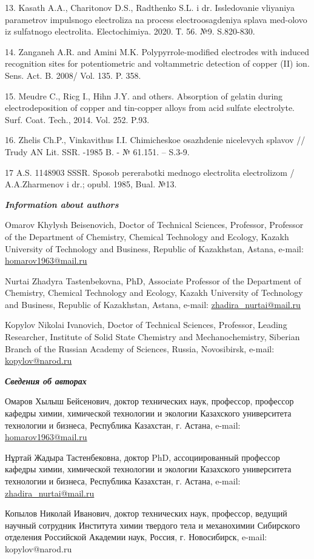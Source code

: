 13. Kasath A.A., Charitonov D.S., Radthenko S.L. i dr. Issledovanie
vliyaniya parametrov impulsnogo electroliza na process electroosagdeniya
splava med-olovo iz sulfatnogo electrolita. Electochimiya. 2020. Т. 56.
№9. S.820-830.

14. Zanganeh A.R. and Amini M.K. Polypyrrole-modified electrodes with
induced recognition sites for potentiometric and voltammetric detection
of copper (II) ion. Sens. Act. B. 2008/ Vol. 135. P. 358.

15. Meudre C., Ricg I., Hihn J.Y. and others. Absorption of gelatin
during electrodeposition of copper and tin-copper alloys from acid
sulfate electrolyte. Surf. Coat. Tech., 2014. Vol. 252. P.93.

16. Zhelis Ch.P., Vinkavithus I.I. Chimicheskoe osazhdenie nicelevych
splavov // Trudy AN Lit. SSR. -1985 B. - № 61.151. -- S.3-9.

17 A.S. 1148903 SSSR. Sposob pererabotki mednogo electrolita
electrolizom / A.A.Zharmenov i dr.; opubl. 1985, Bual. №13.

\emph{{\bfseries Information about authors}}

Omarov Khylysh Beisenovich, Doctor of Technical Sciences, Professor,
Professor of the Department of Chemistry, Chemical Technology and
Ecology, Kazakh University of Technology and Business, Republic of
Kazakhstan, Astana, e-mail:
\href{mailto:homarov1963@mail.ru}{\ul{homarov1963@mail.ru}}

Nurtai Zhadyra Tastenbekovna, PhD, Associate Professor of the Department
of Chemistry, Chemical Technology and Ecology, Kazakh University of
Technology and Business, Republic of Kazakhstan, Astana, e-mail:
\href{mailto:zhadira_nurtai@mail.ru}{\ul{zhadira\_nurtai@mail.ru}}

Kopylov Nikolai Ivanovich, Doctor of Technical Sciences, Professor,
Leading Researcher, Institute of Solid State Chemistry and
Mechanochemistry, Siberian Branch of the Russian Academy of Sciences,
Russia, Novosibirsk, e-mail:
\href{mailto:kopylov@narod.ru}{\ul{kopylov@narod.ru}}

\emph{{\bfseries Сведения об авторах}}

Омаров Хылыш Бейсенович, доктор технических наук, профессор, профессор
кафедры химии, химической технологии и экологии Казахского университета
технологии и бизнеса, Республика Казахстан, г. Астана, e-mail:
\href{mailto:homarov1963@mail.ru}{\ul{homarov1963@mail.ru}}

Нұртай Жадыра Тастенбековна, доктор PhD, ассоциированный профессор
кафедры химии, химической технологии и экологии Казахского университета
технологии и бизнеса, Республика Казахстан, г. Астана, e-mail:
\href{mailto:zhadira_nurtai@mail.ru}{\ul{zhadira\_nurtai@mail.ru}}

Копылов Николай Иванович, доктор технических наук, профессор, ведущий
научный сотрудник Института химии твердого тела и механохимии Сибирского
отделения Российской Академии наук, Россия, г. Новосибирск, e-mail:
kopylov@narod.ru

